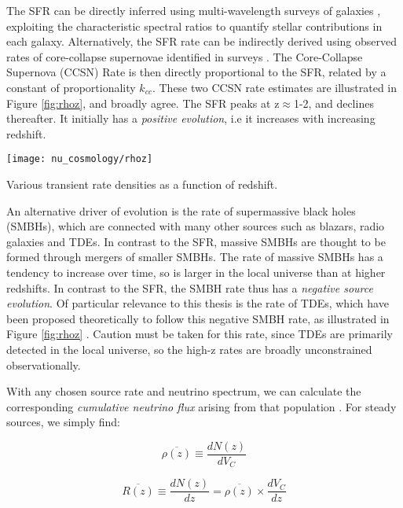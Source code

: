 The SFR can be directly inferred using multi-wavelength surveys of galaxies , exploiting the characteristic spectral ratios to quantify stellar contributions in each galaxy. Alternatively, the SFR rate can be indirectly derived using observed rates of core-collapse supernovae identified in surveys . The Core-Collapse Supernova (CCSN) Rate is then directly proportional to the SFR, related by a constant of proportionality $k_{cc}$. These two CCSN rate estimates are illustrated in Figure \ref{fig:rhoz}, and broadly agree. The SFR peaks at z$\approx$1-2, and declines thereafter. It initially has a \emph{positive evolution}, i.e it increases with increasing redshift. 
\begin{marginfigure}
	\centering \texttt{[image: nu\_cosmology/rhoz]}
	\caption{Various transient rate densities as a function of redshift.}
	\label{fig:rhoz}
\end{marginfigure}


An alternative driver of evolution is the rate of supermassive black holes (SMBHs), which are connected with many other sources such as blazars, radio galaxies and TDEs. In contrast to the SFR, massive SMBHs are thought to be formed through mergers of smaller SMBHs. The rate of massive SMBHs has a tendency to increase over time, so is larger in the local universe than at higher redshifts. In contrast to the SFR, the SMBH rate thus has a \emph{negative source evolution}. Of particular relevance to this thesis is the rate of TDEs, which have been proposed theoretically to follow this negative SMBH rate, as illustrated in Figure \ref{fig:rhoz} . Caution must be taken for this rate, since TDEs are primarily detected in the local universe, so the high-z rates are broadly unconstrained observationally. 

With any chosen source rate and neutrino spectrum, we can calculate the corresponding \emph{cumulative neutrino flux} arising from that population \cite{Strotjohann2020Search}. For steady sources, we simply find:

\begin{equation}
\overline{\rho(z)} \equiv \frac{dN(z)}{dV_{C}}
\end{equation}

\begin{equation}
\overline{R(z)} \equiv \frac{dN(z)}{dz} = \overline{\rho(z)} \times \frac{dV_{C}}{dz}
\label{eq:steady_rate}
\end{equation}

